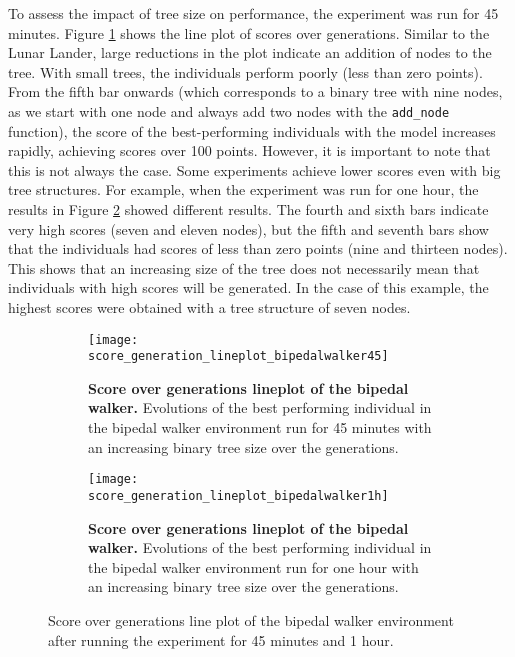 To assess the impact of tree size on performance, the experiment was run for 45 minutes. Figure \ref{fig:bipedal_lineplot1} shows the line plot of scores over generations. Similar to the Lunar Lander, large reductions in the plot indicate an addition of nodes to the tree. With small trees, the individuals perform poorly (less than zero points). From the fifth bar onwards (which corresponds to a binary tree with nine nodes, as we start with one node and always add two nodes with the \texttt{add\_node} function), the score of the best-performing individuals with the model increases rapidly, achieving scores over 100 points. However, it is important to note that this is not always the case. Some experiments achieve lower scores even with big tree structures. For example, when the experiment was run for one hour, the results in Figure \ref{fig:bipedal_lineplot2} showed different results. The fourth and sixth bars indicate very high scores (seven and eleven nodes), but the fifth and seventh bars show that the individuals had scores of less than zero points (nine and thirteen nodes). This shows that an increasing size of the tree does not necessarily mean that individuals with high scores will be generated. In the case of this example, the highest scores were obtained with a tree structure of seven nodes.
\begin{figure}[!ht]
    \centering
    \begin{subfigure}{0.48\textwidth}
		\texttt{[image: score\_generation\_lineplot\_bipedalwalker45]}
		\caption[Lineplot of the bipedal walker environment run for 45 minutes]{
			\textbf{Score over generations lineplot of the bipedal walker.} Evolutions of the best performing individual in the bipedal walker environment run for 45 minutes with an increasing binary tree size over the generations.
			}
		\label{fig:bipedal_lineplot1}
    \end{subfigure}%
    \hspace{1em}
    \begin{subfigure}{0.48\textwidth}
        \texttt{[image: score\_generation\_lineplot\_bipedalwalker1h]}
		\caption[Lineplot of the bipedal walker environment run for 1 hour]{
  			\textbf{Score over generations lineplot of the bipedal walker.} Evolutions of the best performing individual in the bipedal walker environment run for one hour with an increasing binary tree size over the generations.
  			}
		\label{fig:bipedal_lineplot2}
    \end{subfigure}
    \caption{Score over generations line plot of the bipedal walker environment after running the experiment for 45 minutes and 1 hour.}
    \label{Score over generations line plot of the bipedal walker}
\end{figure}

